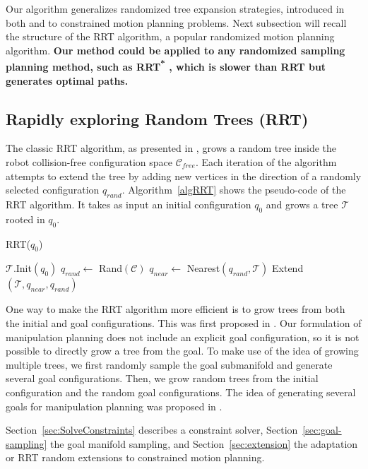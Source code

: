 \documentclass{article}
\begin{document}
Our algorithm generalizes randomized tree expansion strategies, introduced in both \cite{HsuLat99c} and
\cite{kuffner00rrtconnect} to constrained motion planning problems. Next subsection will recall the structure of the RRT algorithm,
a popular randomized motion planning algorithm. 
{\bf Our method could be applied to any randomized sampling planning method, such
as RRT\textsuperscript{*} \cite{Karaman01062011}, which is slower than RRT but generates optimal
paths.}


\subsection{Rapidly exploring Random Trees (RRT)}

The classic RRT algorithm, as presented in  \cite{kuffner00rrtconnect}, grows 
a random tree inside the robot 
collision-free configuration space 
$\mathcal{C}_{free}$. Each iteration of the algorithm attempts to extend the tree
by adding new vertices in the direction of a randomly selected configuration
$q_{rand}$. Algorithm~\ref{algRRT} shows the pseudo-code of the RRT algorithm.
It takes as input an initial configuration $q_0$ and grows a tree  $\mathcal{T}$ rooted 
in $q_0$. 

\begin{algorithm}
\caption{RRT($q_0$)}
\label{algRRT}
\begin{algorithmic}
\STATE $\mathcal{T}.$Init$(q_0)$
\STATE $q_{rand} \leftarrow $ Rand$(\mathcal{C})$
\STATE $q_{near} \leftarrow $ Nearest$(q_{rand},\mathcal{T})$
\STATE Extend$(\mathcal{T},q_{near},q_{rand})$
\ENDFOR

\end{algorithmic}
\end{algorithm}

One way to make the RRT algorithm more efficient is to grow trees from both the initial
and  goal configurations. This was first proposed in 
\cite{kuffner00rrtconnect}. Our formulation of manipulation planning does
not include an explicit goal configuration, so it is not possible to directly grow
a tree from the goal. To make use of the idea of growing multiple trees, we first
randomly sample the goal submanifold and generate several goal configurations. Then, 
we grow random
trees from the initial configuration and the random goal configurations. The idea of
generating several goals for manipulation planning was proposed in \cite{diankov2008bpc}.

Section~\ref{sec:SolveConstraints} describes a constraint solver,
Section~\ref{sec:goal-sampling} the goal manifold sampling, and
Section~\ref{sec:extension} the adaptation or RRT random extensions to
constrained motion planning.
\end{document}

